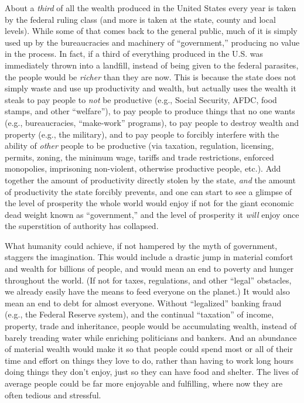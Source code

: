 \documentclass{book}
\begin{document}
About a \emph{third} of all the wealth produced in the United States every year is taken by the federal ruling class (and more is taken at the state, county and local levels). While some of that comes back to the general public, much of it is simply used up by the bureaucracies and machinery of \enquote{government,} producing no value in the process. In fact, if a third of everything produced in the U.S. was immediately thrown into a landfill, instead of being given to the federal parasites, the people would be \emph{richer} than they are now. This is because the state does not simply waste and use up productivity and wealth, but actually uses the wealth it steals to pay people to \emph{not} be productive (e.g., Social Security, AFDC, food stamps, and other \enquote{welfare}), to pay people to produce things that no one wants (e.g., bureaucracies, \enquote{make-work} programs), to pay people to destroy wealth and property (e.g., the military), and to pay people to forcibly interfere with the ability of \emph{other} people to be productive (via taxation, regulation, licensing, permits, zoning, the minimum wage, tariffs and trade restrictions, enforced monopolies, imprisoning non-violent, otherwise productive people, etc.). Add together the amount of productivity directly stolen by the state, \emph{and} the amount of productivity the state forcibly prevents, and one can start to see a glimpse of the level of prosperity the whole world would enjoy if not for the giant economic dead weight known as \enquote{government,} and the level of prosperity it \emph{will} enjoy once the superstition of authority has collapsed.

What humanity could achieve, if not hampered by the myth of government, staggers the imagination. This would include a drastic jump in material comfort and wealth for billions of people, and would mean an end to poverty and hunger throughout the world. (If not for taxes, regulations, and other \enquote{legal} obstacles, we already easily have the means to feed everyone on the planet.) It would also mean an end to debt for almost everyone. Without \enquote{legalized} banking fraud (e.g., the Federal Reserve system), and the continual \enquote{taxation} of income, property, trade and inheritance, people would be accumulating wealth, instead of barely treading water while enriching politicians and bankers. And an abundance of material wealth would make it so that people could spend most or all of their time and effort on things they love to do, rather than having to work long hours doing things they don't enjoy, just so they can have food and shelter. The lives of average people could be far more enjoyable and fulfilling, where now they are often tedious and stressful.
\end{document}
